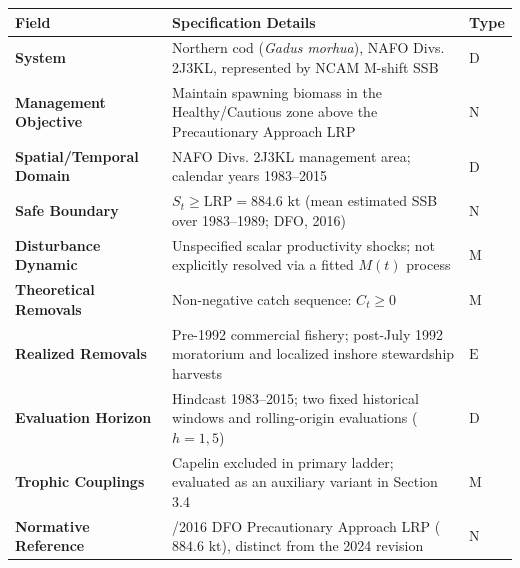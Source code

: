 \documentclass[11pt]{article}
\begin{document}
{\def\LTcaptype{none} %
\begin{longtable}[]{@{}
  >{\raggedright\arraybackslash}p{}
  >{\raggedright\arraybackslash}p{}
  >{\centering\arraybackslash}p{}@{}}
\toprule\noalign{}
\begin{minipage}[b]{\linewidth}\raggedright
Field
\end{minipage} & \begin{minipage}[b]{\linewidth}\raggedright
Specification Details
\end{minipage} & \begin{minipage}[b]{\linewidth}\centering
Type
\end{minipage} \\
\midrule\noalign{}
\endhead
\bottomrule\noalign{}
\endlastfoot
\textbf{System} & Northern cod (\emph{Gadus morhua}), NAFO Divs. 2J3KL,
represented by NCAM M-shift SSB & \(\mathrm{D}\) \\
\textbf{Management Objective} & Maintain spawning biomass in the
Healthy/Cautious zone above the Precautionary Approach LRP &
\(\mathrm{N}\) \\
\textbf{Spatial/Temporal Domain} & NAFO Divs. 2J3KL management area;
calendar years 1983--2015 & \(\mathrm{D}\) \\
\textbf{Safe Boundary} & \(S_t \ge \mathrm{LRP} = 884.6\text{ kt}\)
(mean estimated SSB over 1983--1989; DFO, 2016) & \(\mathrm{N}\) \\
\textbf{Disturbance Dynamic} & Unspecified scalar productivity shocks;
not explicitly resolved via a fitted \(M(t)\) process &
\(\mathrm{M}\) \\
\textbf{Theoretical Removals} & Non-negative catch sequence:
\(C_t \ge 0\) & \(\mathrm{M}\) \\
\textbf{Realized Removals} & Pre-1992 commercial fishery; post-July 1992
moratorium and localized inshore stewardship harvests &
\(\mathrm{E}\) \\
\textbf{Evaluation Horizon} & Hindcast 1983--2015; two fixed historical
windows and rolling-origin evaluations (\(h=1, 5\)) & \(\mathrm{D}\) \\
\textbf{Trophic Couplings} & Capelin excluded in primary ladder;
evaluated as an auxiliary variant in Section 3.4 & \(\mathrm{M}\) \\
\textbf{Normative Reference} & 2010/2016 DFO Precautionary Approach LRP
(\(884.6\text{ kt}\)), distinct from the 2024 revision &
\(\mathrm{N}\) \\
\end{longtable}
}
\end{document}
